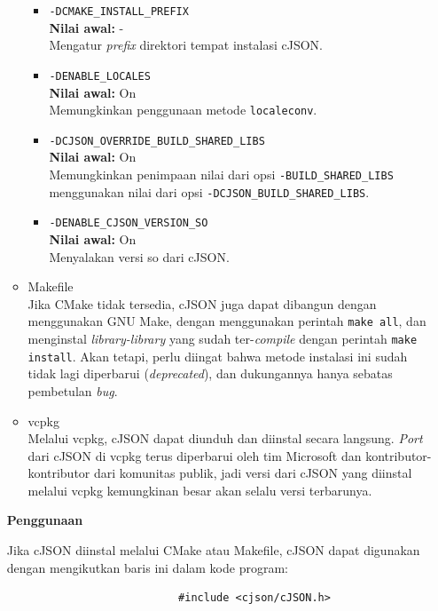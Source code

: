 \documentclass[a4paper,twoside]{article}
\begin{document}
\begin{enumerate}
\begin{itemize}
\begin{itemize}
		\item \verb|-DCMAKE_INSTALL_PREFIX|\\
		\textbf{Nilai awal:} -\\
		Mengatur \textit{prefix} direktori tempat instalasi cJSON.
		\item \verb|-DENABLE_LOCALES|\\
		\textbf{Nilai awal:} On\\
		Memungkinkan penggunaan metode \verb|localeconv|.
		\item \verb|-DCJSON_OVERRIDE_BUILD_SHARED_LIBS|\\
		\textbf{Nilai awal:} On\\
		Memungkinkan penimpaan nilai dari opsi \verb|-BUILD_SHARED_LIBS| menggunakan nilai dari opsi \verb|-DCJSON_BUILD_SHARED_LIBS|.
		\item \verb|-DENABLE_CJSON_VERSION_SO|\\
		\textbf{Nilai awal:} On\\
		Menyalakan versi so dari cJSON.
	\end{itemize}

	\item Makefile\\
	Jika CMake tidak tersedia, cJSON juga dapat dibangun dengan menggunakan GNU Make, dengan menggunakan perintah \verb|make all|, dan menginstal \textit{library-library} yang sudah ter-\textit{compile} dengan perintah \verb|make install|. Akan tetapi, perlu diingat bahwa metode instalasi ini sudah tidak lagi diperbarui (\textit{deprecated}), dan dukungannya hanya sebatas pembetulan \textit{bug}.
	
	\item vcpkg\\
	Melalui vcpkg, cJSON dapat diunduh dan diinstal secara langsung. \textit{Port} dari cJSON di vcpkg terus diperbarui oleh tim Microsoft dan kontributor-kontributor dari komunitas publik, jadi versi dari cJSON yang diinstal melalui vcpkg kemungkinan besar akan selalu versi terbarunya.
\end{itemize}

\textbf{Penggunaan}
\label{sec:cmodules-cJSON-usage}

Jika cJSON diinstal melalui CMake atau Makefile, cJSON dapat digunakan dengan mengikutkan baris ini dalam kode program:

\begin{verbatim}
                           #include <cjson/cJSON.h>
\end{verbatim}


\end{enumerate}
\end{document}
